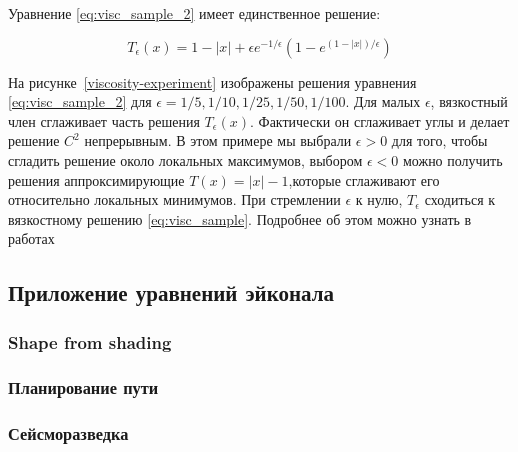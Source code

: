 Уравнение \eqref{eq:visc_sample_2} имеет единственное решение:

\begin{equation*}
  T_\epsilon(x) = 1 - |x| + \epsilon e^{-1/\epsilon}(1 - e^{(1-|x|)/\epsilon})
\end{equation*}


На рисунке~\ref{viscosity-experiment} изображены решения уравнения
\eqref{eq:visc_sample_2} для  $\epsilon =
1/5,1/10,1/25,1/50,1/100$. Для малых $\epsilon$, вязкостный член
сглаживает часть решения $T_\epsilon(x)$. Фактически он сглаживает
углы и делает решение $C^2$ непрерывным. В этом примере мы выбрали
$\epsilon >0$ для того, чтобы сгладить решение около локальных максимумов, выбором
$\epsilon <0$ можно получить решения аппроксимирующие $T(x) = |x| -
1$,которые сглаживают его относительно локальных минимумов. При
стремлении $\epsilon$ к нулю, $T_\epsilon$ сходиться к вязкостному
решению \eqref{eq:visc_sample}. Подробнее об этом можно узнать в
работах \cite{V1984,V1983}

\subsection{Приложение уравнений эйконала}
\label{sec:applivation-eikonal-equations}

\subsubsection{Shape from shading}
\label{sec:shape-from-shading}

\subsubsection{Планирование пути}
\label{sec:path-planning}

\subsubsection{Сейсморазведка}
\label{sec:seismic-examination}


